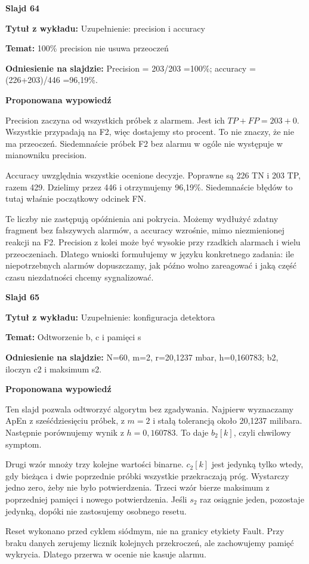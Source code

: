 \documentclass[a4paper,11pt]{article}
\newcommand{\NumerSlajdu}{1}
\newcommand{\Komentarz}[3]{%
  \gdef\NumerSlajdu{#1}%
  {\Large\bfseries Slajd #1\par}\smallskip
  \textbf{Tytuł z wykładu:} #2\par
  \textbf{Temat:} #3\par\medskip
}
\begin{document}
\Komentarz{64}{Uzupełnienie: precision i accuracy}{100\% precision nie usuwa przeoczeń}
{\small\color{black!65}\textbf{Odniesienie na slajdzie:} Precision = 203/203 =100\%; accuracy = (226+203)/446 =96,19\%.\par}
\medskip
\textbf{Proponowana wypowiedź}\par
Precision zaczyna od wszystkich próbek z alarmem. Jest ich $TP+FP=203+0$. Wszystkie przypadają na F2, więc dostajemy sto procent. To nie znaczy, że nie ma przeoczeń. Siedemnaście próbek F2 bez alarmu w ogóle nie występuje w mianowniku precision.

Accuracy uwzględnia wszystkie ocenione decyzje. Poprawne są 226 TN i 203 TP, razem 429. Dzielimy przez 446 i otrzymujemy 96,19\%. Siedemnaście błędów to tutaj właśnie początkowy odcinek FN.

Te liczby nie zastępują opóźnienia ani pokrycia. Możemy wydłużyć zdatny fragment bez fałszywych alarmów, a accuracy wzrośnie, mimo niezmienionej reakcji na F2. Precision z kolei może być wysokie przy rzadkich alarmach i wielu przeoczeniach. Dlatego wnioski formułujemy w języku konkretnego zadania: ile niepotrzebnych alarmów dopuszczamy, jak późno wolno zareagować i jaką część czasu niezdatności chcemy sygnalizować.
\clearpage

\Komentarz{65}{Uzupełnienie: konfiguracja detektora}{Odtworzenie b, c i pamięci s}
{\small\color{black!65}\textbf{Odniesienie na slajdzie:} N=60, m=2, r=20,1237 mbar, h=0,160783; b2, iloczyn c2 i maksimum s2.\par}
\medskip
\textbf{Proponowana wypowiedź}\par
Ten slajd pozwala odtworzyć algorytm bez zgadywania. Najpierw wyznaczamy ApEn z sześćdziesięciu próbek, z $m=2$ i stałą tolerancją około 20,1237 milibara. Następnie porównujemy wynik z $h=0{,}160783$. To daje $b_2[k]$, czyli chwilowy symptom.

Drugi wzór mnoży trzy kolejne wartości binarne. $c_2[k]$ jest jedynką tylko wtedy, gdy bieżąca i dwie poprzednie próbki wszystkie przekraczają próg. Wystarczy jedno zero, żeby nie było potwierdzenia. Trzeci wzór bierze maksimum z poprzedniej pamięci i nowego potwierdzenia. Jeśli $s_2$ raz osiągnie jeden, pozostaje jedynką, dopóki nie zastosujemy osobnego resetu.

Reset wykonano przed cyklem siódmym, nie na granicy etykiety Fault. Przy braku danych zerujemy licznik kolejnych przekroczeń, ale zachowujemy pamięć wykrycia. Dlatego przerwa w ocenie nie kasuje alarmu.
\end{document}
